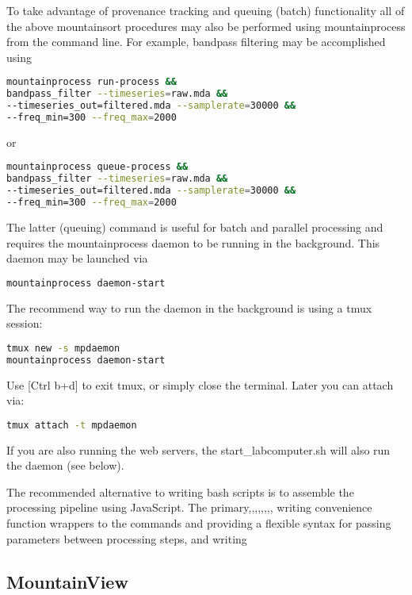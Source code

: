 \documentclass{article}
\begin{document}
To take advantage of provenance tracking and queuing (batch) functionality all of the above mountainsort procedures may also be performed using mountainprocess from the command line. For example, bandpass filtering may be accomplished using

\begin{lstlisting}[language=bash]
mountainprocess run-process &&
bandpass_filter --timeseries=raw.mda &&
--timeseries_out=filtered.mda --samplerate=30000 &&
--freq_min=300 --freq_max=2000
\end{lstlisting}

or

\begin{lstlisting}[language=bash]
mountainprocess queue-process &&
bandpass_filter --timeseries=raw.mda &&
--timeseries_out=filtered.mda --samplerate=30000 &&
--freq_min=300 --freq_max=2000
\end{lstlisting}

The latter (queuing) command is useful for batch and parallel processing and requires the mountainprocess daemon to be running in the background. This daemon may be launched via

\begin{lstlisting}[language=bash]
mountainprocess daemon-start
\end{lstlisting}

The recommend way to run the daemon in the background is using a tmux session:

\begin{lstlisting}[language=bash]
tmux new -s mpdaemon
mountainprocess daemon-start
\end{lstlisting}

Use [Ctrl b+d] to exit tmux, or simply close the terminal. Later you can attach via:

\begin{lstlisting}[language=bash]
tmux attach -t mpdaemon
\end{lstlisting}

If you are also running the web servers, the start\_labcomputer.sh will also run the daemon (see below).

The recommended alternative to writing bash scripts is to assemble the processing pipeline using JavaScript. The primary,,,,,,,, writing convenience function wrappers to the commands and providing a flexible syntax for passing parameters between processing steps, and writing

\subsection{MountainView}
\end{document}
